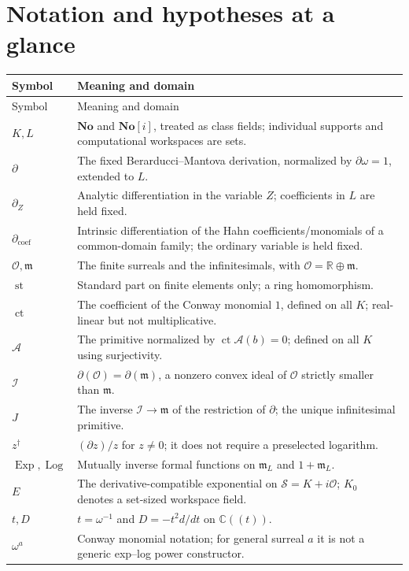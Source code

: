 \documentclass[11pt]{article}
\numberwithin{equation}{section}
\theoremstyle{definition}
\newcommand{\No}{\mathbf{No}}
\newcommand{\R}{\mathbb R}
\newcommand{\C}{\mathbb C}
\newcommand{\OO}{\mathcal O}
\newcommand{\mm}{\mathfrak m}
\newcommand{\II}{\mathcal I}
\newcommand{\DD}{\partial}
\newcommand{\Dc}{\partial_{\mathrm{coef}}}
\newcommand{\Dz}{\partial_Z}
\newcommand{\Prim}{\mathcal A}
\newcommand{\Exp}{\operatorname{Exp}}
\newcommand{\Log}{\operatorname{Log}}
\newcommand{\ct}{\operatorname{ct}}
\newcommand{\st}{\operatorname{st}}
\begin{document}
\section{Notation and hypotheses at a glance}
\label{app:notation}
\begin{longtable}{@{}>{\raggedright\arraybackslash}p{}>{\raggedright\arraybackslash}p{}@{}}
\toprule
Symbol & Meaning and domain \\
\midrule
\endfirsthead
\toprule
Symbol & Meaning and domain \\
\midrule
\endhead
$K,L$ & $\No$ and $\No[i]$, treated as class fields; individual supports and computational workspaces are sets. \\
$\DD$ & The fixed Berarducci--Mantova derivation, normalized by $\DD\omega=1$, extended to $L$. \\
$\Dz$ & Analytic differentiation in the variable $Z$; coefficients in $L$ are held fixed. \\
$\Dc$ & Intrinsic differentiation of the Hahn coefficients/monomials of a common-domain family; the ordinary variable is held fixed. \\
$\OO,\mm$ & The finite surreals and the infinitesimals, with $\OO=\R\oplus\mm$. \\
$\st$ & Standard part on finite elements only; a ring homomorphism. \\
$\ct$ & The coefficient of the Conway monomial $1$, defined on all $K$; real-linear but not multiplicative. \\
$\Prim$ & The primitive normalized by $\ct\Prim(b)=0$; defined on all $K$ using surjectivity. \\
$\II$ & $\DD(\OO)=\DD(\mm)$, a nonzero convex ideal of $\OO$ strictly smaller than $\mm$. \\
$J$ & The inverse $\II\to\mm$ of the restriction of $\DD$; the unique infinitesimal primitive. \\
$z^\dagger$ & $(\DD z)/z$ for $z\ne0$; it does not require a preselected logarithm. \\
$\Exp,\Log$ & Mutually inverse formal functions on $\mm_L$ and $1+\mm_L$. \\
$E$ & The derivative-compatible exponential on $\mathcal S=K+i\OO$; $K_0$ denotes a set-sized workspace field. \\
$t,D$ & $t=\omega^{-1}$ and $D=-t^2d/dt$ on $\C((t))$. \\
$\omega^a$ & Conway monomial notation; for general surreal $a$ it is not a generic exp--log power constructor. \\
\bottomrule
\end{longtable}
\end{document}
